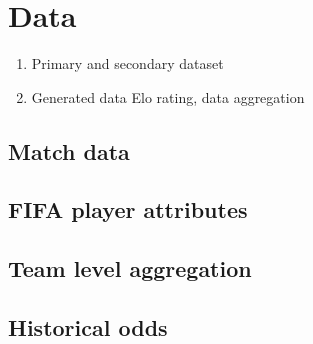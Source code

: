 \section{Data}
\begin{enumerate}
    \item Primary and secondary dataset
    \item Generated data
    Elo rating, data aggregation
\end{enumerate}


\subsection{Match data}
\subsection{FIFA player attributes}
\subsection{Team level aggregation}
\subsection{Historical odds}
